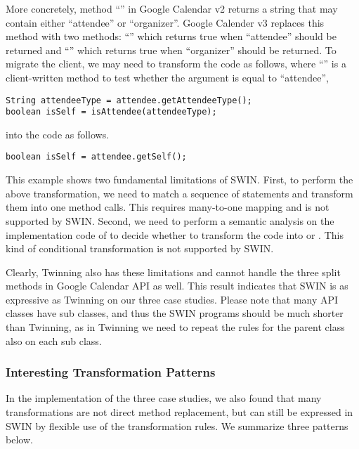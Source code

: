 More concretely, method ``'' in
Google Calendar v2 returns a string that may contain either
``attendee'' or ``organizer''. Google Calender v3 replaces this method
with two methods: ``'' which returns true when
 ``attendee'' should be returned and ``'' which
returns true when ``organizer'' should be returned. To migrate the
client, we may need to transform the code as follows, where
``'' is a client-written method to test whether the
argument is equal to ``attendee'',
\begin{lstlisting}
String attendeeType = attendee.getAttendeeType();
boolean isSelf = isAttendee(attendeeType);  
\end{lstlisting}
into the code as follows.
\begin{lstlisting}
boolean isSelf = attendee.getSelf();  
\end{lstlisting}

This example shows two fundamental limitations of SWIN. First, to
perform the above transformation, we need to match a sequence of
statements and transform them into one method calls. This requires
many-to-one mapping and is not supported by SWIN. Second, we need to
perform a semantic analysis on the implementation code of
 to decide whether to transform the code into
 or . This kind of conditional
transformation is not supported by SWIN.

Clearly, Twinning also has these limitations and cannot handle the
three split methods in Google Calendar API as well. This result
indicates that SWIN is as expressive as Twinning on our three case
studies. Please note that many API classes have sub classes, and thus
the SWIN programs should be much shorter than Twinning, as in Twinning
we need to repeat the rules for the parent class also on each sub
class. %

\subsubsection{Interesting Transformation Patterns}
In the implementation of the three case studies, we also found that
many transformations are not direct method replacement, but can still
be expressed in SWIN by flexible use of the transformation rules. We
summarize three patterns below.

